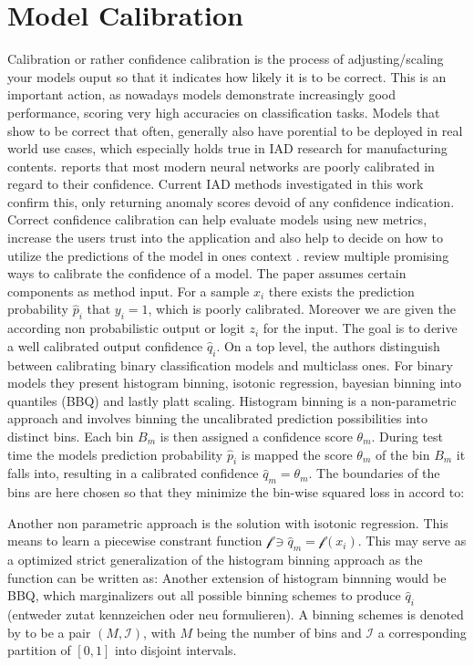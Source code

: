 \section{Model Calibration}
\label{sec:modelcalibration}
Calibration or rather confidence calibration is the process of adjusting/scaling your models ouput so that it indicates how likely it is to be correct. This is an important action, as nowadays 
models demonstrate increasingly good performance, scoring very high accuracies on classification tasks. Models that show to be correct that often, generally also have porential to be deployed in 
real world use cases, which especially holds true in IAD research for manufacturing contents. \cite{Guo_2017_tempscalingetc} reports that most modern neural networks are poorly calibrated in regard 
to their confidence. Current IAD methods investigated in this work confirm this, only returning anomaly scores devoid of any confidence indication. Correct confidence calibration can help evaluate 
models using new metrics, increase the users trust into the application and also help to decide on how to utilize the predictions of the model in ones context \cite{whyUncertaintyIsImportant}. 
\newline
\cite{Guo_2017_tempscalingetc} review multiple promising ways to calibrate the confidence of a model. The paper assumes certain components as method input. For a sample $x_i$ there exists the 
prediction probability $\hat{p}_i$ that $y_i = 1$, which is poorly calibrated. Moreover we are given the according non probabilistic output or logit $z_i$ for the input. The goal is to derive a 
well calibrated output confidence $\hat{q}_i$.
On a top level, the authors distinguish between calibrating binary classification models and multiclass 
ones. For binary models they present histogram binning, isotonic regression, bayesian binning into quantiles (BBQ) and lastly platt scaling. 
Histogram binning is a non-parametric approach and involves binning the uncalibrated prediction possibilities into distinct bins. Each bin $B_m$ is then assigned a confidence score $\theta _m$. During 
test time the models prediction probability $\hat{p}_i$ is mapped the score $\theta _m$ of the bin $B_m$ it falls into, resulting in a calibrated confidence $\hat{q}_m = \theta _m$. The 
boundaries of the bins are here chosen so that they minimize the bin-wise squared loss in accord to:


Another non parametric approach is the solution with isotonic regression. This means to learn a piecewise constrant function $\mathcal{f} \ni \hat{q}_m = \mathcal{f}(x_i)$. This may serve as a 
optimized strict generalization of the histogram binning approach as the function can be written as: %
Another extension of histogram binnning would be BBQ, which marginalizers out all possible binning schemes to produce $\hat{q}_i$ (entweder zutat kennzeichen oder neu formulieren). A binning schemes 
is denoted by \cite{Guo_2017_tempscalingetc} to be a pair $(M, \mathcal{I})$, with $M$ being the number of bins and $\mathcal{I}$ a corresponding partition of $[0, 1]$ into disjoint intervals. 


